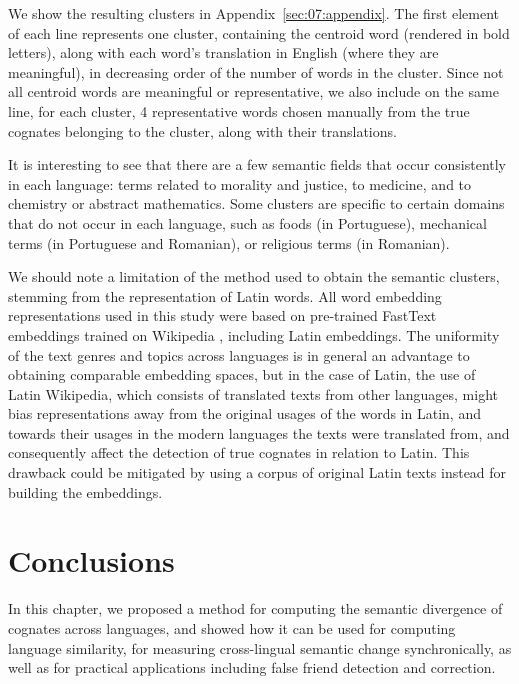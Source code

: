 \documentclass[output=paper]{langsci/langscibook}
\begin{document}
We show the resulting clusters in Appendix~\ref{sec:07:appendix}. The first element of each line represents one cluster, containing the centroid word (rendered in bold letters), along with each word's translation in English (where they are meaningful), in decreasing order of the number of words in the cluster. Since not all centroid words are meaningful or representative, we also include on the same line, for each cluster, 4 representative words chosen manually from the true cognates belonging to the cluster, along with their translations.

It is interesting to see that there are a few semantic fields that occur consistently in each language: terms related to morality and justice, to medicine, and to chemistry or abstract mathematics. Some clusters are specific to certain domains that do not occur in each language, such as foods (in Portuguese), mechanical terms (in Portuguese and Romanian), or religious terms (in Romanian).

We should note a limitation of the method used to obtain the semantic clusters, stemming from the representation of Latin words. All word embedding representations used in this study were based on pre-trained FastText embeddings trained on Wikipedia \citep{cognatesuban:conneau2017word}, including Latin embeddings. The uniformity of the text genres and topics across languages is in general an advantage to obtaining comparable embedding spaces, but in the case of Latin, the use of Latin Wikipedia, which consists of translated texts from other languages, might bias representations away from the original usages of the words in Latin, and towards their usages in the modern languages the texts were translated from, and consequently affect the detection of true cognates in relation to Latin. This drawback could be mitigated by using a corpus of original Latin texts instead for building the embeddings.

\section{Conclusions}
\label{section:conclusions}

In this chapter, we proposed a method for computing the semantic divergence of cognates across languages, and showed how it can be used for computing language similarity, for measuring cross-lingual semantic change synchronically, as well as for practical applications including false friend detection and correction. 
\end{document}
